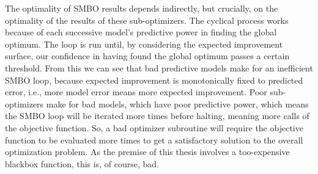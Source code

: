 The optimality of SMBO results depends indirectly, but crucially, on the optimality of the results of these sub-optimizers. The cyclical process works because of each successive model's predictive power in finding the global optimum. The loop is run until, by considering the expected improvement surface, our confidence in having found the global optimum passes a certain threshold. From this we can see that bad predictive models make for an inefficient SMBO loop, because expected improvement is monotonically fixed to predicted error, i.e., more model error means more expected improvement. Poor sub-optimizers make for bad models, which have poor predictive power, which means the SMBO loop will be iterated more times before halting, meaning more calls of the objective function. So, a bad optimizer subroutine will require the objective function to be evaluated more times to get a satisfactory solution to the overall optimization problem. As the premise of this thesis involves a too-expensive blackbox function, this is, of course, bad.

%




